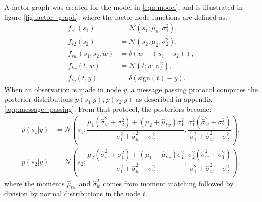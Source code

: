 \documentclass{article}
\begin{document}
	A factor graph was created for the model in \eqref{eqn:model}, and is illustrated in figure \ref{fig:factor_graph}, where the factor node functions are defined as:
		\begin{subequations}
		\begin{align}
			f_{s1}(s_1) &= \mathcal{N}(s_1; \mu_1, \sigma_1^2),\\
			f_{s2}(s_2) &= \mathcal{N}(s_2; \mu_2, \sigma_2^2),\\
			f_{sw}(s_1, s_2, w) &= \delta(w-(s_1-s_2)),\\
			f_{tw}(t,w) &= \mathcal{N}(t; w, \sigma_t^2),\\
			f_{ty}(t,y) &= \delta(\text{sign}(t)-y).
		\end{align}
		\end{subequations}
	When an observation is made in node $y$, a message passing protocol computes the posterior distributions $ p(s_1|y), p(s_2|y) $ as described in appendix \ref{app:message_passing}. From that protocol, the posteriors become:
	\clearpage
	\begin{subequations}\label{eqn:posterior_MP}
	\begin{align}
	p(s_1|y) &= \mathcal{N}(s_1; \dfrac{\mu_1(\hat{\sigma}_w^2 + \sigma_2^2) + (\mu_2 + \hat{\mu}_{tw})\sigma_1^2}{\sigma_1^2+\hat{\sigma}_w^2 + \sigma_2^2}, \dfrac{\sigma_1^2 ( \hat{\sigma}_w^2 +  \sigma_2^2)}{\sigma_1^2+\hat{\sigma}_w^2 + \sigma_2^2}),\\
	p(s_2|y) &= \mathcal{N}(s_2; \dfrac{\mu_2(\hat{\sigma}_w^2 + \sigma_1^2) + (\mu_1 - \hat{\mu}_{tw})\sigma_2^2}{\sigma_1^2+\hat{\sigma}_w^2 + \sigma_2^2}, \dfrac{\sigma_2^2( \hat{\sigma}_w^2  + \sigma_1^2)}{\sigma_1^2+\hat{\sigma}_w^2 + \sigma_2^2}),
	\end{align}
	\end{subequations}
	where the moments $ \hat{\mu}_{tw} $ and $ \hat{\sigma}_{w}^2 $ comes from moment matching followed by division by normal distributions in the node $ t $.
\end{document}
